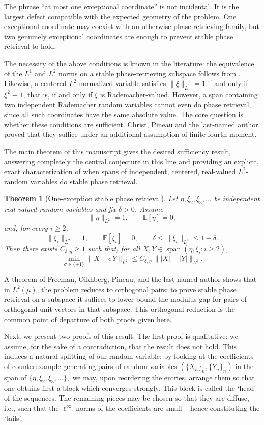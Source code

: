 \documentclass[11pt]{amsart}
\numberwithin{equation}{section}
\newtheorem{theorem}{Theorem}[section]
\theoremstyle{definition}
\theoremstyle{remark}
\newcommand{\E}{\mathbb E}
\newcommand{\Span}{\operatorname{span}}
\newcommand{\abs}[1]{\lvert #1 \rvert}
\newcommand{\norm}[1]{\lVert #1 \rVert}
\begin{document}
The phrase ``at most one exceptional coordinate'' is not incidental.  It is the largest defect compatible with the expected geometry of the
problem.  One exceptional coordinate may coexist with an otherwise
phase-retrieving family, but two genuinely exceptional coordinates are enough to prevent stable phase retrieval to hold.

The necessity of the above conditions is known in the literature: the equivalence of the
$L^1$ and $L^2$ norms on a stable phase-retrieving subspace follows from
\cite{FOTP}.
Likewise, a centered $L^2$-normalized variable satisfies
$\norm{\xi}_{L^1}=1$ if and only if $\xi^2\equiv 1$, that is, if and only if
$\xi$ is Rademacher-valued.  However, a span containing two independent Rademacher random variables
cannot even do phase retrieval, since all such coordinates have the same absolute value. The core question is whether these conditions are sufficient. Christ, Pineau and the last-named author \cite{christ2022examples} proved that they suffice under an additional assumption of finite fourth moment. 

The main theorem of this manuscript gives the desired sufficiency result, answering completely the central conjecture in this line and providing an explicit, exact characterization of when spans of independent, centered, real-valued $L^2$-random variables do stable phase retrieval. 

\begin{theorem}[One-exception stable phase retrieval]\label{thm:main}
Let $\eta,\xi_2,\xi_3,\dots$ be independent real-valued random variables and
fix $\delta>0$.  Assume
\[
\norm{\eta}_{L^2}=1,
\qquad
\E[\eta]=0,
\]
and, for every $i\ge2$,
\[
\norm{\xi_i}_{L^2}=1,
\qquad
\E[\xi_i]=0,
\qquad
\delta\le \norm{\xi_i}_{L^1}\le 1-\delta.
\]
Then there exists $C_{\delta,\eta}\ge1$ such that, for all
$X,Y\in \overline{\Span}(\eta,\xi_i:i\ge2)$,
\[
\min_{\sigma\in\{\pm1\}}\norm{X-\sigma Y}_{L^2}
\le
C_{\delta,\eta}\,\norm{\abs{X}-\abs{Y}}_{L^2}.
\]
\end{theorem}
A theorem of Freeman, Oikhberg, Pineau, and the last-named author \cite{FOTP} shows that in
$L^2(\mu)$, the problem reduces to orthogonal pairs: to prove stable
phase retrieval on a subspace it suffices to lower-bound the modulus gap for
pairs of orthogonal unit vectors in that subspace.  This orthogonal reduction
is the common point of departure of both proofs given here. 

Next, we present two proofs of this result. The first proof is qualitative: we assume, for the sake of a contradiction, that the result does not hold. This induces a natural splitting of our random variable: by looking at the coefficients of counterexample-generating pairs of random variables $(\{X_n\}_n, \{Y_n\}_n)$ in the span of $\{\eta,\xi_2,\xi_3,\dots\},$ we may, upon reordering the entries, arrange them so that one obtains first a block which converges strongly. This block is called the `head' of the sequences. The remaining pieces may be chosen so that they are diffuse, i.e., such that the $\ell^{\infty}$-norms of the coefficients are small -- hence constituting the `tails'.
\end{document}
